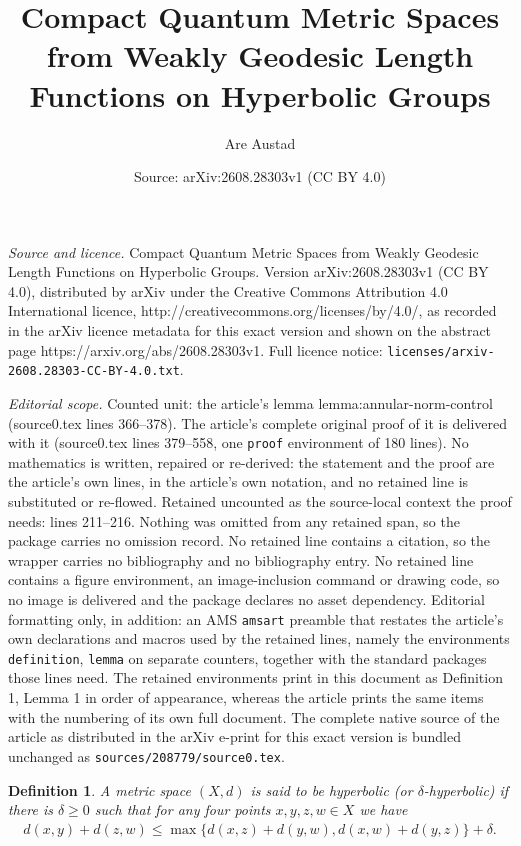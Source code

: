 \documentclass[10pt,a4paper]{amsart}
\title{Compact Quantum Metric Spaces from Weakly Geodesic Length Functions on Hyperbolic Groups}
\author{Are Austad}
\date{Source: arXiv:2608.28303v1 (CC BY 4.0)}
\newtheorem{definition}{Definition}
\begin{document}
\maketitle

\noindent\emph{Source and licence.} Compact Quantum Metric Spaces from Weakly Geodesic Length Functions on Hyperbolic Groups. Version arXiv:2608.28303v1 (CC BY 4.0), distributed by arXiv under the Creative Commons Attribution 4.0 International licence, http://creativecommons.org/licenses/by/4.0/, as recorded in the arXiv licence metadata for this exact version and shown on the abstract page https://arxiv.org/abs/2608.28303v1. Full licence notice: \texttt{licenses/arxiv-2608.28303-CC-BY-4.0.txt}.\par\smallskip

\noindent\textit{Editorial scope.} Counted unit: the article's lemma lemma:annular-norm-control (source0.tex lines 366--378). The article's complete original proof of it is delivered with it (source0.tex lines 379--558, one \texttt{proof} environment of 180 lines). No mathematics is written, repaired or re-derived: the statement and the proof are the article's own lines, in the article's own notation, and no retained line is substituted or re-flowed.  Retained uncounted as the source-local context the proof needs: lines 211--216.  Nothing was omitted from any retained span, so the package carries no omission record.  No retained line contains a citation, so the wrapper carries no bibliography and no bibliography entry.  No retained line contains a figure environment, an image-inclusion command or drawing code, so no image is delivered and the package declares no asset dependency.  Editorial formatting only, in addition: an AMS \texttt{amsart} preamble that restates the article's own declarations and macros used by the retained lines, namely the environments \texttt{definition}, \texttt{lemma} on separate counters, together with the standard packages those lines need.  The retained environments print in this document as Definition 1, Lemma 1 in order of appearance, whereas the article prints the same items with the numbering of its own full document.  The complete native source of the article as distributed in the arXiv e-print for this exact version is bundled unchanged as \texttt{sources/208779/source0.tex}.
\begin{definition}\label{def:hyperbolic-metric-space}
    A metric space $(X,d)$ is said to be \emph{hyperbolic} (or $\delta$-hyperbolic) if there is $\delta \geq 0$ such that for any four points $x,y,z,w \in X$ we have
    \begin{align*}
        d(x,y) + d(z,w) \leq \max \{ d(x,z) + d(y,w), d(x,w) + d(y,z) \} + \delta .
    \end{align*}
\end{definition}
\end{document}
